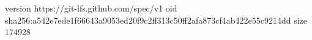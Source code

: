 version https://git-lfs.github.com/spec/v1
oid sha256:a542e7ede1f66643a9053ed20f9c2ff313c50ff2afa873cf4ab422e55c9214dd
size 174928
